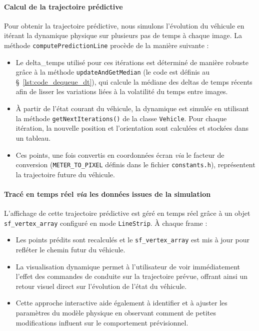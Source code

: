 \paragraph{Calcul de la trajectoire prédictive}
Pour obtenir la trajectoire prédictive, nous simulons l'évolution du véhicule en itérant la dynamique physique sur plusieurs pas de temps à chaque image.
La méthode \texttt{computePredictionLine} procède de la manière suivante :
\begin{itemize}
    \item Le \gls{delta_temps} utilisé pour ces itérations est déterminé de manière robuste grâce à la méthode \texttt{updateAndGetMedian} (le code est définis au \S~\ref{lst:code_dequeue_dt}), qui calcule la médiane des deltas de temps récents afin de lisser les variations liées à la volatilité du temps entre images.
    \item À partir de l'état courant du véhicule, la dynamique est simulée en utilisant la méthode \texttt{getNextIterations()} de la classe \texttt{Vehicle}.
    Pour chaque itération, la nouvelle position et l'orientation sont calculées et stockées dans un tableau.
    \item Ces points, une fois convertis en coordonnées écran \textit{via} le facteur de conversion (\texttt{METER\_TO\_PIXEL} définis dans le fichier \texttt{constants.h}), représentent la trajectoire future du véhicule.
\end{itemize}

\paragraph{Tracé en temps réel \textit{via} les données issues de la simulation}
L'affichage de cette trajectoire prédictive est géré en temps réel grâce à un objet \texttt{\gls{sf_vertex_array}}\cite{sfml_sf_vertexarray} configuré en mode \texttt{LineStrip}.
À chaque frame :
\begin{itemize}
    \item Les points prédits sont recalculés et le \texttt{\gls{sf_vertex_array}} est mis à jour pour refléter le chemin futur du véhicule.
    \item La visualisation dynamique permet à l'utilisateur de voir immédiatement l'effet des commandes de conduite sur la trajectoire prévue, offrant ainsi un retour visuel direct sur l'évolution de l'état du véhicule.
    \item Cette approche interactive aide également à identifier et à ajuster les paramètres du modèle physique en observant comment de petites modifications influent sur le comportement prévisionnel.
\end{itemize}

